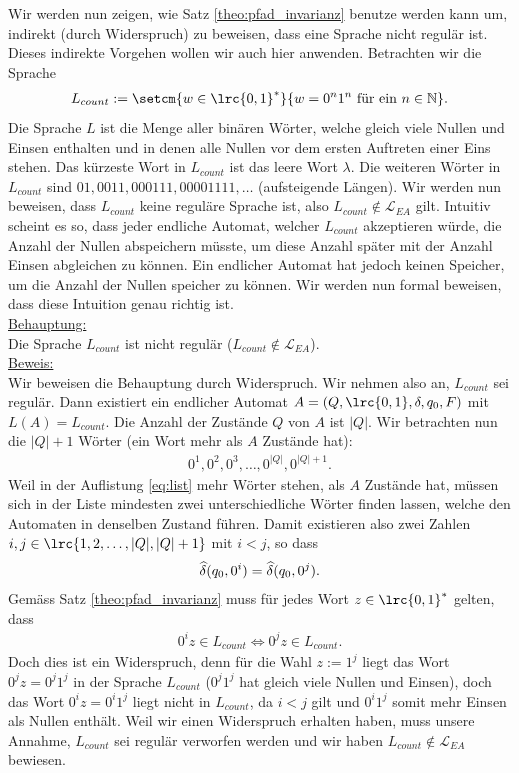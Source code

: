 \noindent
Wir werden nun zeigen, wie Satz \cref{theo:pfad_invarianz} benutze werden kann um, indirekt (durch Widerspruch) zu beweisen, dass eine Sprache nicht regulär ist. Dieses indirekte Vorgehen wollen wir auch hier anwenden. Betrachten wir die Sprache
\begin{align*}
	L_{count} := \setcm{w\in \lrc{0,1}^*}{w = 0^n 1^n\text{ für ein } n\in\mathbb{N}}.
\end{align*}
Die Sprache $L$ ist die Menge aller binären Wörter, welche gleich viele Nullen und Einsen enthalten und in denen alle Nullen vor dem ersten Auftreten einer Eins stehen. Das kürzeste Wort in $L_{count}$ ist das leere Wort $\lambda$. Die weiteren Wörter in $L_{count}$ sind $01, 0011, 000111, 00001111, \ldots $ (aufsteigende Längen). Wir werden nun beweisen, dass $L_{count}$ keine reguläre Sprache ist, also $L_{count}\notin \mathcal{L}_{EA}$ gilt. Intuitiv scheint es so, dass jeder endliche Automat, welcher $L_{count}$ akzeptieren würde, die Anzahl der Nullen abspeichern müsste, um diese Anzahl später mit der Anzahl Einsen abgleichen zu können. Ein endlicher Automat hat jedoch keinen Speicher, um die Anzahl der Nullen speicher zu können. Wir werden nun formal beweisen, dass diese Intuition genau richtig ist.\\

\noindent
\underline{Behauptung:}\\
Die Sprache $L_{count}$ ist nicht regulär ($L_{count}\notin \mathcal{L}_{EA}$).\\

\noindent
\underline{Beweis:}\\
Wir beweisen die Behauptung durch Widerspruch. Wir nehmen also an, $L_{count}$ sei regulär. Dann existiert ein endlicher Automat $A = (Q,\lrc{0,1}, \delta, q_0, F)$ mit $L(A) = L_{count}$. Die Anzahl der Zustände $Q$ von $A$ ist $|Q|$. Wir betrachten nun die $|Q|+1$ Wörter (ein Wort mehr als $A$ Zustände hat):
\begin{align}\label{eq:list}
	0^1, 0^2, 0^3, \ldots , 0^{|Q|}, 0^{|Q|+1}.
\end{align}
Weil in der Auflistung \cref{eq:list} mehr Wörter stehen, als $A$ Zustände hat, müssen sich in der Liste mindesten zwei unterschiedliche Wörter finden lassen, welche den Automaten in denselben Zustand führen. Damit existieren also zwei Zahlen $i,j\in\lrc{1,2,\ldots ,|Q|, |Q|+1}$ mit $i<j$, so dass
\begin{align*}
	\widehat{\delta}(q_0,0^i) = \widehat{\delta}(q_0,0^j).
\end{align*}
Gemäss Satz \cref{theo:pfad_invarianz} muss für jedes Wort $z\in\lrc{0,1}^*$ gelten, dass
\begin{align*}
	0^iz\in L_{count} \Longleftrightarrow 0^jz\in L_{count}.
\end{align*}
Doch dies ist ein Widerspruch, denn für die Wahl $z := 1^j$ liegt das Wort $0^jz = 0^j1^j$ in der Sprache $L_{count}$ ($0^j1^j$ hat gleich viele Nullen und Einsen), doch das Wort $0^iz = 0^i1^j$ liegt nicht in $L_{count}$, da $i<j$ gilt und $0^i1^j$ somit mehr Einsen als Nullen enthält. Weil wir einen Widerspruch erhalten haben, muss unsere Annahme, $L_{count}$ sei regulär verworfen werden und wir haben $L_{count}\notin \mathcal{L}_{EA}$ bewiesen.

